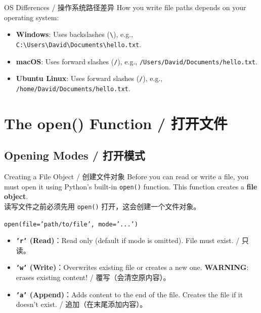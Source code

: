 \documentclass[11pt,a4paper]{report}
\let\oldtexttt\texttt
\renewcommand{\texttt}[1]{\textcolor{mainblue}{\oldtexttt{#1}}}
\begin{document}
\begin{warning}{OS Differences / 操作系统路径差异}
    How you write file paths depends on your operating system:
    \begin{itemize}
        \item \textbf{Windows}: Uses backslashes (\texttt{\textbackslash}), e.g., \texttt{C:\textbackslash Users\textbackslash David\textbackslash Documents\textbackslash hello.txt}.
        \item \textbf{macOS}: Uses forward slashes (\texttt{/}), e.g., \texttt{/Users/David/Documents/hello.txt}.
        \item \textbf{Ubuntu Linux}: Uses forward slashes (\texttt{/}), e.g., \texttt{/home/David/Documents/hello.txt}.
    \end{itemize}
\end{warning}

\section{The open() Function / 打开文件}

\subsection{Opening Modes / 打开模式}

\begin{concept}{Creating a File Object / 创建文件对象}
    Before you can read or write a file, you must open it using Python's built-in \texttt{open()} function. This function creates a \textbf{file object}. \\
    读写文件之前必须先用 \texttt{open()} 打开，这会创建一个文件对象。

    \texttt{open(file='path/to/file', mode='...')}
    \begin{itemize}[itemsep=0.5em]
        \item \textbf{\texttt{'r'} (Read)}：Read only (default if mode is omitted). File must exist. / 只读。
        \item \textbf{\texttt{'w'} (Write)}：Overwrites existing file or creates a new one. \textbf{WARNING}: erases existing content! / 覆写（会清空原内容）。
        \item \textbf{\texttt{'a'} (Append)}：Adds content to the end of the file. Creates the file if it doesn't exist. / 追加（在末尾添加内容）。
    \end{itemize}
\end{concept}
\end{document}
